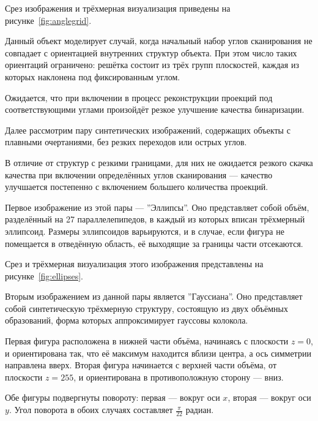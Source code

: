 Срез изображения и трёхмерная визуализация приведены на рисунке~\ref{fig:anglegrid}.

Данный объект моделирует случай, когда начальный набор углов сканирования не совпадает с ориентацией внутренних структур объекта. При этом число таких ориентаций ограничено: решётка состоит из трёх групп плоскостей, каждая из которых наклонена под фиксированным углом.

Ожидается, что при включении в процесс реконструкции проекций под соответствующими углами произойдёт резкое улучшение качества бинаризации.


Далее рассмотрим пару синтетических изображений, содержащих объекты с плавными очертаниями, без резких переходов или острых углов.

В отличие от структур с резкими границами, для них не ожидается резкого скачка качества при включении определённых углов сканирования — качество улучшается постепенно с включением большего количества проекций.

Первое изображение из этой пары — ''Эллипсы''. Оно представляет собой объём, разделённый на 27 параллелепипедов, в каждый из которых вписан трёхмерный эллипсоид. Размеры эллипсоидов варьируются, и в случае, если фигура не помещается в отведённую область, её выходящие за границы части отсекаются.

Срез и трёхмерная визуализация этого изображения представлены на рисунке~\ref{fig:ellipses}.


Вторым изображением из данной пары является ''Гауссиана''. Оно представляет собой синтетическую трёхмерную структуру, состоящую из двух объёмных образований, форма которых аппроксимирует гауссовы колокола.

Первая фигура расположена в нижней части объёма, начинаясь с плоскости \(z = 0\), и ориентирована так, что её максимум находится вблизи центра, а ось симметрии направлена вверх. Вторая фигура начинается с верхней части объёма, от плоскости \(z = 255\), и ориентирована в противоположную сторону — вниз.

Обе фигуры подвергнуты повороту: первая — вокруг оси \(x\), вторая — вокруг оси \(y\). Угол поворота в обоих случаях составляет \(\frac{\pi}{22}\) радиан.

